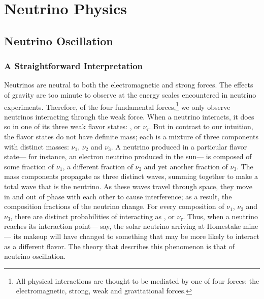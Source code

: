 \chapter{Neutrino Physics}
\label{nu_osc_chapter}


\section{Neutrino Oscillation}

\subsection{A Straightforward Interpretation}

Neutrinos are neutral to both the electromagnetic and strong forces.
The effects of gravity are too minute to observe at the energy scales
encountered in neutrino experiments.
Therefore, of the four fundamental forces,\footnote{All physical interactions
are thought to be mediated by one of four forces: the electromagnetic,
strong, weak and gravitational forces.} we only observe neutrinos interacting
through the weak force.
When a neutrino interacts, it does so in one of its three weak flavor states:
\nue, \numu or $\nu_\tau$.
But in contrast to our intuition, the flavor states do not have definite mass;
each is a mixture of three components with distinct masses: $\nu_1$, $\nu_2$
and $\nu_3$.
A neutrino produced in a particular flavor state--- for instance, an electron
neutrino produced in the sun--- is composed of some fraction of $\nu_1$, a
different fraction of $\nu_2$ and yet another fraction of $\nu_3$.
The mass components propagate as three distinct waves, summing together to make
a total wave that is the neutrino.
As these waves travel through space, they move in and out of phase with each
other to cause interference; as a result, the composition fractions of the
neutrino change.
For every composition of $\nu_1$, $\nu_2$ and $\nu_3$, there are distinct
probabilities of interacting as \nue, \numu or $\nu_\tau$.
Thus, when a neutrino reaches its interaction point--- say, the solar neutrino
arriving at Homestake mine--- its makeup will have changed to something that
may be more likely to interact as a different flavor.
The theory that describes this phenomenon is that of neutrino oscillation.

